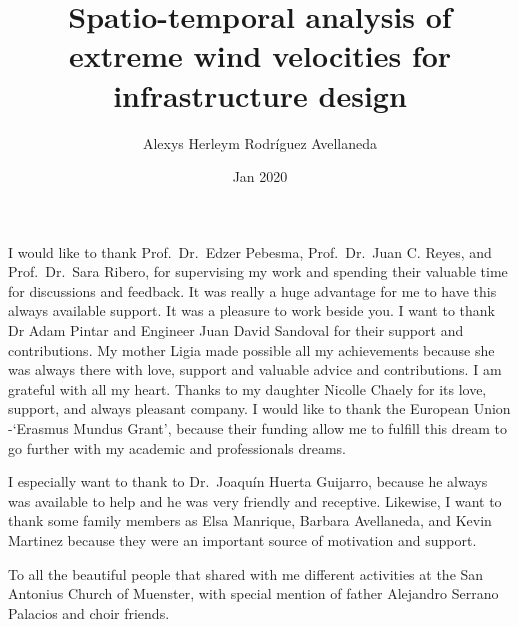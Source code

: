 \documentclass[12pt,oneside]{reedthesis}
\title{Spatio-temporal analysis of extreme wind velocities for infrastructure design}
\author{Alexys Herleym Rodríguez Avellaneda}
\date{Jan 2020}
\begin{document}
  \maketitle

\frontmatter %
\pagestyle{empty} %
  \begin{acknowledgements}
    I would like to thank Prof.~Dr.~Edzer Pebesma, Prof.~Dr.~Juan C. Reyes, and Prof.~Dr.~Sara Ribero, for supervising my work and spending their valuable time for discussions and feedback. It was really a huge advantage for me to have this always available support. It was a pleasure to work beside you. I want to thank Dr Adam Pintar and Engineer Juan David Sandoval for their support and contributions. My mother Ligia made possible all my achievements because she was always there with love, support and valuable advice and contributions. I am grateful with all my heart. Thanks to my daughter Nicolle Chaely for its love, support, and always pleasant company. I would like to thank the European Union -`Erasmus Mundus Grant', because their funding allow me to fulfill this dream to go further with my academic and professionals dreams.
    
    \par
    
    I especially want to thank to Dr.~Joaquín Huerta Guijarro, because he always was available to help and he was very friendly and receptive. Likewise, I want to thank some family members as Elsa Manrique, Barbara Avellaneda, and Kevin Martinez because they were an important source of motivation and support.
    
    \par
    
    To all the beautiful people that shared with me different activities at the San Antonius Church of Muenster, with special mention of father Alejandro Serrano Palacios and choir friends.
  \end{acknowledgements}
\end{document}
